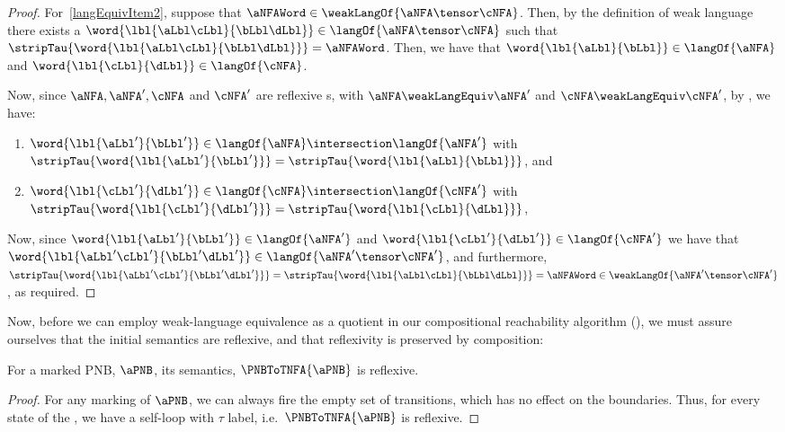 \begin{proof}
    For~\ref{langEquivItem2}, suppose that $\aNFAWord
    \in \weakLangOf{\aNFA \tensor \cNFA}$. Then, by the definition of weak
    language there exists a $\word{\lbl{\aLbl\cLbl}{\bLbl\dLbl}} \in
    \langOf{\aNFA \tensor \cNFA}$ such that
    $\stripTau{\word{\lbl{\aLbl\cLbl}{\bLbl\dLbl}}} = \aNFAWord$. Then, we have
    that $\word{\lbl{\aLbl}{\bLbl}} \in \langOf{\aNFA}$ and
    $\word{\lbl{\cLbl}{\dLbl}} \in \langOf{\cNFA}$.

    Now, since $\aNFA, \aNFA', \cNFA$ and $\cNFA'$ are reflexive \TNFA{}s, with
    $\aNFA \weakLangEquiv \aNFA'$ and $\cNFA \weakLangEquiv \cNFA'$, by
    , we have:
    \begin{enumerate}
        \item $\word{\lbl{\aLbl'}{\bLbl'}} \in \langOf{\aNFA} \intersection
            \langOf{\aNFA'}$ with $\stripTau{\word{\lbl{\aLbl'}{\bLbl'}}} =
            \stripTau{\word{\lbl{\aLbl}{\bLbl}}}$, and
        \item $\word{\lbl{\cLbl'}{\dLbl'}} \in \langOf{\cNFA} \intersection
            \langOf{\cNFA'}$ with $\stripTau{\word{\lbl{\cLbl'}{\dLbl'}}} =
            \stripTau{\word{\lbl{\cLbl}{\dLbl}}}$,
    \end{enumerate}

    Now, since $\word{\lbl{\aLbl'}{\bLbl'}} \in \langOf{\aNFA'}$ and
    $\word{\lbl{\cLbl'}{\dLbl'}} \in \langOf{\cNFA'}$ we have that
    $\word{\lbl{\aLbl'\cLbl'}{\bLbl'\dLbl'}} \in \langOf{\aNFA' \tensor
    \cNFA'}$, and furthermore,
    $\stripTau{\word{\lbl{\aLbl'\cLbl'}{\bLbl'\dLbl'}}} =
    \stripTau{\word{\lbl{\aLbl\cLbl}{\bLbl\dLbl}}} = \aNFAWord \in
    \weakLangOf{\aNFA' \tensor \cNFA'}$, as required.
\end{proof}

Now, before we can employ weak-language equivalence as a quotient in our
compositional reachability algorithm (), we
must assure ourselves that the initial \TNFA{} semantics are reflexive, and
that reflexivity is preserved by composition:

\begin{lemma}
    \label{lem:TNFASemanticsReflexive}
    For a marked PNB, $\aPNB$, its \TNFA{} semantics, $\PNBToTNFA{\aPNB}$ is
    reflexive.
\end{lemma}
\begin{proof}
    For any marking of $\aPNB$, we can always fire the empty set of
    transitions, which has no effect on the boundaries. Thus, for every state
    of the \TNFA{}, we have a self-loop with $\tau$ label, i.e.\
    $\PNBToTNFA{\aPNB}$ is reflexive.
\end{proof}


